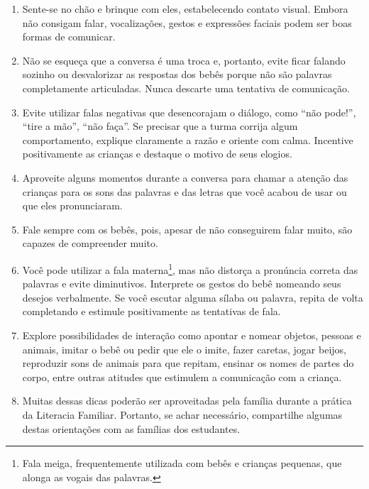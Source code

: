 \documentclass[11pt]{extarticle}
\begin{document}
\begin{enumerate}
\item Sente-se no chão e brinque com eles, estabelecendo 
contato visual. Embora não consigam falar, vocalizações, 
gestos e expressões faciais podem ser boas formas de comunicar.

\item Não se esqueça que a conversa é uma troca e, portanto, 
evite ficar falando sozinho ou desvalorizar as respostas dos 
bebês porque não são palavras completamente articuladas. 
Nunca descarte uma tentativa de comunicação. 

\item Evite utilizar falas negativas que desencorajam o diálogo, 
como ``não pode!'', ``tire a mão'', ``não faça''. Se precisar que a turma 
corrija algum comportamento, explique claramente a razão e 
oriente com calma. Incentive positivamente as crianças e 
destaque o motivo de seus elogios. 

\item Aproveite alguns momentos durante a conversa para chamar 
a atenção das crianças para os sons das palavras e das letras que você 
acabou de usar ou que eles pronunciaram.  

\item Fale sempre com os bebês, pois, apesar de não conseguirem 
falar muito, são capazes de compreender muito.

\item Você pode utilizar a fala materna\footnote{Fala meiga, frequentemente 
utilizada com bebês e crianças pequenas, que alonga as 
vogais das palavras.}, mas não distorça 
a pronúncia correta das palavras e evite diminutivos. Interprete 
os gestos do bebê nomeando seus desejos verbalmente. Se você escutar 
alguma sílaba ou palavra, repita de volta completando e estimule 
positivamente as tentativas de fala. 

\item Explore possibilidades de interação como apontar e 
nomear objetos, pessoas e animais, imitar o bebê ou pedir que 
ele o imite, fazer caretas, jogar beijos, reproduzir sons de 
animais para que repitam, ensinar os nomes de partes do corpo, 
entre outras atitudes que estimulem a comunicação com a criança. 

\item Muitas dessas dicas poderão ser aproveitadas pela 
família durante a prática da Literacia Familiar. Portanto, 
se achar necessário, compartilhe algumas destas orientações 
com as famílias dos estudantes.
\end{enumerate}
\end{document}
